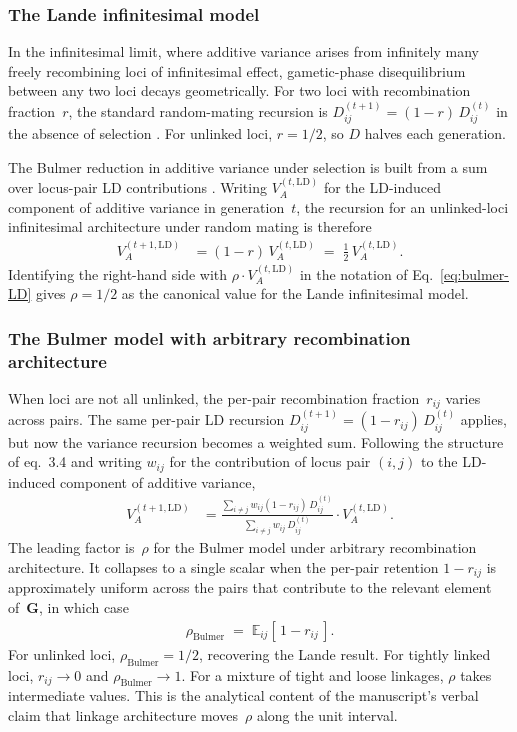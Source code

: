 \documentclass[9pt,twocolumn,twoside,lineno]{gsajnl}
\newcommand{\mat}[1]{\mathbf{#1}}
\begin{document}
\subsubsection{The Lande infinitesimal model}

In the infinitesimal limit, where additive variance arises from infinitely many freely recombining loci of infinitesimal effect, gametic-phase disequilibrium between any two loci decays geometrically. For two loci with recombination fraction~$r$, the standard random-mating recursion is $D_{ij}^{(t+1)} = (1-r)\, D_{ij}^{(t)}$ in the absence of selection \citep{Bulmer1971}. For unlinked loci, $r = 1/2$, so $D$ halves each generation.

The Bulmer reduction in additive variance under selection is built from a sum over locus-pair LD contributions \citep{Bulmer1971,Bulmer1980}. Writing $V_A^{(t,\mathrm{LD})}$ for the LD-induced component of additive variance in generation~$t$, the recursion for an unlinked-loci infinitesimal architecture under random mating is therefore
\begin{align}
V_A^{(t+1,\mathrm{LD})} &= (1-r)\, V_A^{(t,\mathrm{LD})} \;=\; \tfrac{1}{2}\, V_A^{(t,\mathrm{LD})}.
\label{eq:rho_lande}
\end{align}
Identifying the right-hand side with $\rho \cdot V_A^{(t,\mathrm{LD})}$ in the notation of Eq.~\ref{eq:bulmer-LD} gives $\rho = 1/2$ as the canonical value for the Lande infinitesimal model.

\subsubsection{The Bulmer model with arbitrary recombination architecture}

When loci are not all unlinked, the per-pair recombination fraction~$r_{ij}$ varies across pairs. The same per-pair LD recursion $D_{ij}^{(t+1)} = (1-r_{ij})\, D_{ij}^{(t)}$ applies, but now the variance recursion becomes a weighted sum. Following the structure of \citet{Bulmer1971} eq.~3.4 and writing $w_{ij}$ for the contribution of locus pair $(i,j)$ to the LD-induced component of additive variance,
\begin{align}
V_A^{(t+1,\mathrm{LD})} &= \frac{\sum_{i\neq j} w_{ij} (1 - r_{ij})\, D_{ij}^{(t)}}{\sum_{i\neq j} w_{ij}\, D_{ij}^{(t)}} \cdot V_A^{(t,\mathrm{LD})}.
\label{eq:rho_bulmer_general}
\end{align}
The leading factor is~$\rho$ for the Bulmer model under arbitrary recombination architecture. It collapses to a single scalar when the per-pair retention $1 - r_{ij}$ is approximately uniform across the pairs that contribute to the relevant element of~$\mat{G}$, in which case
\begin{align}
\rho_{\mathrm{Bulmer}} \;=\; \mathbb{E}_{ij}[\,1 - r_{ij}\,].
\label{eq:rho_bulmer_scalar}
\end{align}
For unlinked loci, $\rho_{\mathrm{Bulmer}} = 1/2$, recovering the Lande result. For tightly linked loci, $r_{ij} \to 0$ and $\rho_{\mathrm{Bulmer}} \to 1$. For a mixture of tight and loose linkages, $\rho$ takes intermediate values. This is the analytical content of the manuscript's verbal claim that linkage architecture moves~$\rho$ along the unit interval.
\end{document}
